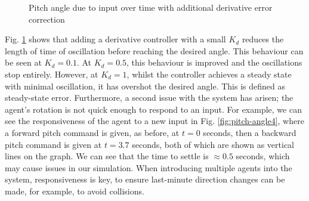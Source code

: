 \documentclass[12pt]{article}
\begin{document}
\begin{figure}[ht]
\begin{subfigure}{.4\textwidth}
    \end{subfigure}
    \caption{Pitch angle due to input over time with additional derivative error correction}
    \label{fig:pitch-angle3}
\end{figure}

Fig. \ref{fig:pitch-angle3} shows that adding a derivative controller with a small $K_d$ reduces the length of time of oscillation before reaching the desired angle. This behaviour can be seen at $K_d = 0.1$. At $K_d = 0.5$, this behaviour is improved and the oscillations stop entirely. However, at $K_d = 1$, whilst the controller achieves a steady state with minimal oscillation, it has overshot the desired angle. This is defined as steady-state error. Furthermore, a second issue with the system has arisen; the agent's rotation is not quick enough to respond to an input. For example, we can see the responsiveness of the agent to a new input in Fig. \ref{fig:pitch-angle4}, where a forward pitch command is given, as before, at $t = 0$ seconds, then a backward pitch command is given at $t = 3.7$ seconds, both of which are shown as vertical lines on the graph. We can see that the time to settle is $\approx 0.5$ seconds, which may cause issues in our simulation. When introducing multiple agents into the system, responsiveness is key, to ensure last-minute direction changes can be made, for example, to avoid collisions.
\end{document}
